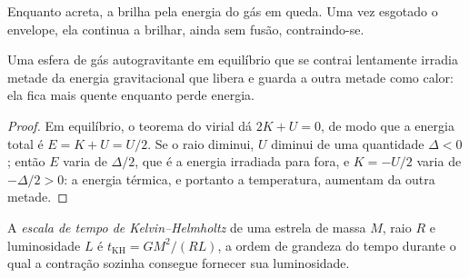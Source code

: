 \begin{omfigure}
\par{}
\end{omfigure}

Enquanto acreta, a  brilha pela energia do gás em queda. Uma vez
esgotado o envelope, ela continua a brilhar, ainda sem fusão,
contraindo-se.

\begin{proposition}
\label{prop:b2:ism-star-formation:contraction}
Uma esfera de gás autogravitante em equilíbrio que se contrai lentamente irradia
metade da energia gravitacional que libera e guarda a outra metade como calor:
ela fica mais quente enquanto perde energia.
\end{proposition}

\begin{proof}
Em equilíbrio, o teorema do virial dá $2K + U = 0$, de modo que a energia total é
$E = K + U = U/2$. Se o raio diminui, $U$ diminui de uma quantidade
$\Delta < 0$; então $E$ varia de $\Delta/2$, que é a energia irradiada
para fora, e $K = -U/2$ varia de $-\Delta/2 > 0$: a energia térmica, e portanto
a temperatura, aumentam da outra metade.
\end{proof}

\begin{definition}\label{def:b2:ism-star-formation:kh-time}
A \emph{escala de tempo de Kelvin--Helmholtz}
de uma estrela de massa $M$, raio $R$ e luminosidade $L$ é
$t_{\mathrm{KH}} = GM^2/(RL)$, a ordem de grandeza do tempo durante o qual
a contração sozinha consegue fornecer sua luminosidade.
\end{definition}

